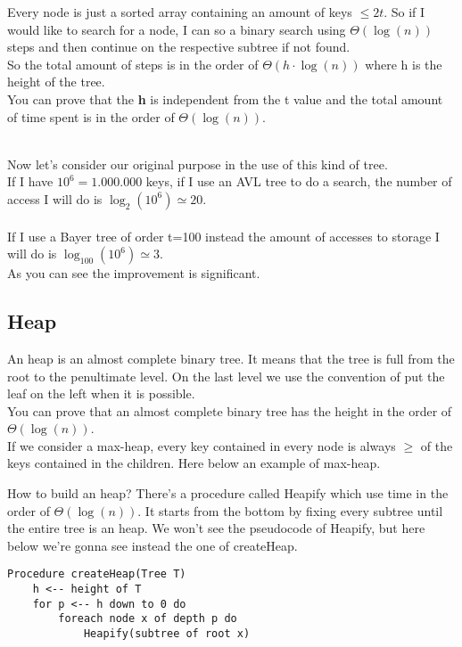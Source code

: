 \documentclass{article}
\begin{document}
Every node is just a sorted array containing an amount of keys $\leq 2t$. So if I would like to search for a node, I can so a binary search using $\Theta(\log(n))$ steps and then continue on the respective subtree if not found.\\
So the total amount of steps is in the order of $\Theta(h\cdot \log(n))$ where h is the height of the tree.\\
You can prove that the \textbf{h} is independent from the t value and the total amount of time spent is in the order of $\Theta(\log(n))$.\\ \\
\begin{large}
Now let's consider our original purpose in the use of this kind of tree.\\
If I have $10^6= 1.000.000$ keys, if I use an AVL tree to do a search, the number of access I will do is $\log_2(10^6) \simeq 20$.\\ \\
If I use a Bayer tree of order t=100 instead the amount of accesses to storage I will do is $\log_{100}(10^6) \simeq 3$.\\
As you can see the improvement is significant.
\end{large}
\subsection{Heap}
An heap is an almost complete binary tree. It means that the tree is full from the root to the penultimate level. On the last level we use the convention of put the leaf on the left when it is possible.\\
You can prove that an almost complete binary tree has the height in the order of $\Theta(\log(n))$.\\
If we consider a max-heap, every key contained in every node is always $\geq$ of the keys contained in the children. Here below an example of max-heap.\\

How to build an heap? There's a procedure called Heapify which use time in the order of $\Theta(\log(n))$. It starts from the bottom by fixing every subtree until the entire tree is an heap. We won't see the pseudocode of Heapify, but here below we're gonna see instead the one of createHeap.
\begin{lstlisting}[caption={\\\textit{createHeap procedure.}}]
Procedure createHeap(Tree T)
	h <-- height of T
	for p <-- h down to 0 do
		foreach node x of depth p do
			Heapify(subtree of root x)
\end{lstlisting}
\end{document}

